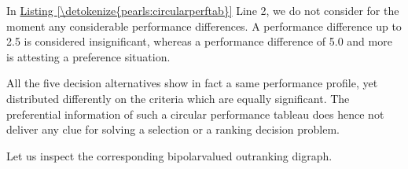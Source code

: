 \documentclass[a4paper,12pt,english]{sphinxhowto}
\begin{document}
\sphinxAtStartPar
In \hyperref[\detokenize{pearls:circularperftab}]{Listing \ref{\detokenize{pearls:circularperftab}}} Line 2, we do not consider for the moment any considerable performance differences. A performance difference up to 2.5 is considered insignificant, whereas a performance difference of 5.0 and more is attesting a preference situation.

%
\begin{sphinxVerbatim}[commandchars=\\\{\},numbers=left,firstnumber=1,stepnumber=1]
\end{sphinxVerbatim}
\sphinxresetverbatimhllines

\sphinxAtStartPar
All the five decision alternatives show in fact a same performance profile, yet distributed differently on the criteria which are equally significant. The preferential information of such a circular performance tableau does hence not deliver any clue for solving a selection or a ranking decision problem.

\sphinxAtStartPar
Let us inspect the corresponding bipolar\sphinxhyphen{}valued outranking digraph.

\begin{sphinxVerbatim}[commandchars=\\\{\},numbers=left,firstnumber=1,stepnumber=1]
   
  
\end{sphinxVerbatim}
\end{document}
